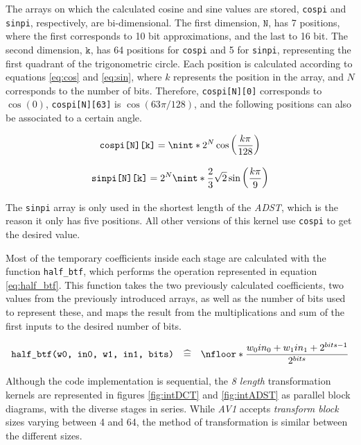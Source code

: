 The arrays on which the calculated cosine and sine values are stored, \texttt{cospi} and \texttt{sinpi}, respectively, are bi-dimensional. The first dimension, $\texttt{N}$,  has 7 positions, where the first corresponds to 10 bit approximations, and the last to 16 bit. The second dimension, $\texttt{k}$, has 64 positions for \texttt{cospi} and 5 for \texttt{sinpi}, representing the first quadrant of the trigonometric circle. Each position is calculated according to equations \ref{eq:cos} and \ref{eq:sin}, where $k$ represents the position in the array, and $N$ corresponds to the number of bits. Therefore, \verb|cospi[N][0]| corresponds to $\cos(0)$, \verb|cospi[N][63]| is $\cos(63\pi/128)$, and the following positions can also be associated to a certain angle.

\begin{equation} \label{eq:cos}
    \texttt{cospi[N][k]} = \nint*{2^{N}\cos\left(\frac{k\pi}{128}\right)}
\end{equation}

\begin{equation} \label{eq:sin}
    \texttt{sinpi[N][k]} = 2^{N}\nint*{\frac{2}{3}\sqrt{2}\sin\left(\frac{k\pi}{9}\right)}
\end{equation}

The \texttt{sinpi} array is only used in the shortest length of the \emph{ADST}, which is the reason it only has five positions. All other versions of this kernel use \texttt{cospi} to get the desired value.

Most of the temporary coefficients inside each stage are calculated with the function \verb|half_btf|, which performs the operation represented in equation \ref{eq:half_btf}. This function takes the two previously calculated coefficients, two values from the previously introduced arrays, as well as the number of bits used to represent these, and maps the result from the multiplications and sum of the first inputs to the desired number of bits.

\begin{equation} \label{eq:half_btf}
    \texttt{half\_btf(w0, in0, w1, in1, bits)} \quad \widehat{=} \quad \nfloor*{\frac{w_0in_0 + w_1in_1 + 2^{bits -1}}{2^{bits}}}
\end{equation}

Although the code implementation is sequential, the \emph{8 length} transformation kernels are represented in figures \ref{fig:intDCT} and \ref{fig:intADST} as parallel block diagrams, with the diverse stages in series. While \emph{AV1} accepts \emph{transform block} sizes varying between 4 and 64, the method of transformation is similar between the different sizes.

